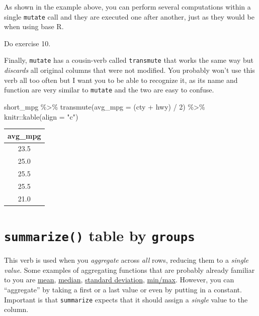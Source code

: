\documentclass[
]{book}
\newenvironment{Shaded}{\begin{snugshade}}{\end{snugshade}}
\newcommand{\AttributeTok}[1]{\textcolor[rgb]{0.77,0.63,0.00}{#1}}
\newcommand{\DecValTok}[1]{\textcolor[rgb]{0.00,0.00,0.81}{#1}}
\newcommand{\FunctionTok}[1]{\textcolor[rgb]{0.00,0.00,0.00}{#1}}
\newcommand{\NormalTok}[1]{#1}
\newcommand{\SpecialCharTok}[1]{\textcolor[rgb]{0.00,0.00,0.00}{#1}}
\newcommand{\StringTok}[1]{\textcolor[rgb]{0.31,0.60,0.02}{#1}}
\begin{document}
As shown in the example above, you can perform several computations within a single \texttt{mutate} call and they are executed one after another, just as they would be when using base R.

Do exercise 10.

Finally, \texttt{mutate} has a cousin-verb called \texttt{transmute} that works the same way but \emph{discards} all original columns that were not modified. You probably won't use this verb all too often but I want you to be able to recognize it, as its name and function are very similar to \texttt{mutate} and the two are easy to confuse.

\begin{Shaded}
\begin{Highlighting}[]
\NormalTok{short\_mpg }\SpecialCharTok{\%\textgreater{}\%}
  \FunctionTok{transmute}\NormalTok{(}\AttributeTok{avg\_mpg =}\NormalTok{ (cty }\SpecialCharTok{+}\NormalTok{ hwy) }\SpecialCharTok{/} \DecValTok{2}\NormalTok{) }\SpecialCharTok{\%\textgreater{}\%}
\NormalTok{  knitr}\SpecialCharTok{::}\FunctionTok{kable}\NormalTok{(}\AttributeTok{align =} \StringTok{"c"}\NormalTok{)}
\end{Highlighting}
\end{Shaded}

\begin{tabular}{c}
\hline
avg\_mpg\\
\hline
23.5\\
\hline
25.0\\
\hline
25.5\\
\hline
25.5\\
\hline
21.0\\
\hline
\end{tabular}

\hypertarget{summarize}{%
\section{\texorpdfstring{\texttt{summarize()} table by \texttt{groups}}{summarize() table by groups}}\label{summarize}}

This verb is used when you \emph{aggregate} across \emph{all} rows, reducing them to a \emph{single value}. Some examples of aggregating functions that are probably already familiar to you are \href{https://stat.ethz.ch/R-manual/R-devel/library/base/html/mean.html}{mean}, \href{https://stat.ethz.ch/R-manual/R-devel/library/stats/html/median.html}{median}, \href{https://stat.ethz.ch/R-manual/R-devel/library/stats/html/sd.html}{standard deviation}, \href{https://stat.ethz.ch/R-manual/R-patched/library/base/html/Extremes.html}{min/max}. However, you can ``aggregate'' by taking a first or a last value or even by putting in a constant. Important is that \texttt{summarize} expects that it should assign a \emph{single} value to the column.
\end{document}
